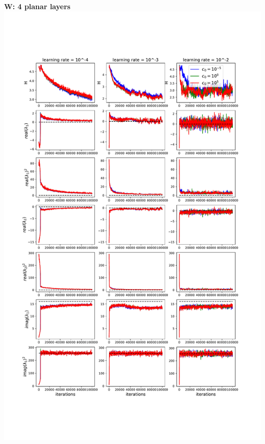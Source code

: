 \documentclass[11pt]{article}
\begin{document}
\clearpage
\begin{center}
\textbf{W: 4 planar layers} \\
\includegraphics[scale=.45]{images/learnW_4P.pdf} \\
\end{center}
\end{document}
